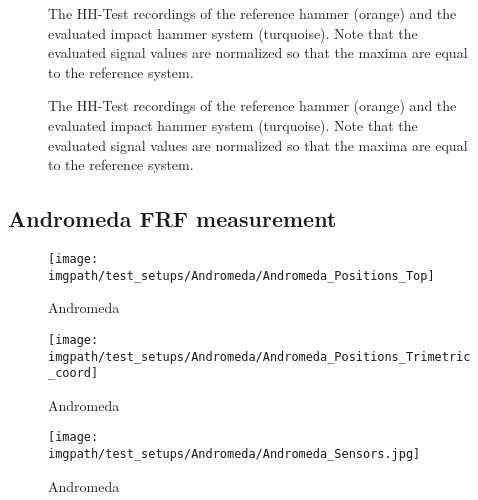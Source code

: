 \begin{figure}[!htb]
    \centering
    
    \caption[HH-Test comparison]{The HH-Test recordings of the reference hammer (orange) and the evaluated impact hammer system (turquoise). Note that the evaluated signal values are normalized so that the maxima are equal to the reference system.}
    \label{tab:mcu_com_protocol}
\end{figure}
\begin{figure}[!htb]
    \centering
    
    \caption[HH-Test comparison]{The HH-Test recordings of the reference hammer (orange) and the evaluated impact hammer system (turquoise). Note that the evaluated signal values are normalized so that the maxima are equal to the reference system.}
    \label{fig:HH_noise}
\end{figure}

\subsection{Andromeda FRF measurement}

\begin{figure}[!htb]
    \centering
    \texttt{[image: \\imgpath/test\_setups/Andromeda/Andromeda\_Positions\_Top]}
    \caption[Andromeda Positions Top View]{Andromeda}
    \label{Andromeda_Positions_Top}
\end{figure}

\begin{figure}[!htb]
    \centering
    \texttt{[image: \\imgpath/test\_setups/Andromeda/Andromeda\_Positions\_Trimetric\_coord]}
    \caption[Andromeda Positions Trimetric View]{Andromeda}
    \label{Andromeda_Positions_Trimetric_coord}
\end{figure}

\begin{figure}[!htb]
    \centering
    \texttt{[image: \\imgpath/test\_setups/Andromeda/Andromeda\_Sensors.jpg]}
    \caption[Andromeda Positions Sensors View]{Andromeda}
    \label{Andromeda_Sensors}
\end{figure}


